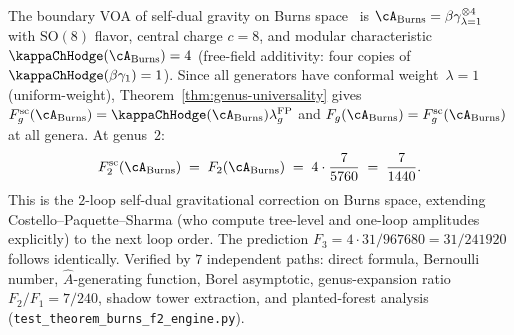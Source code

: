 \begin{remark}%
\label{rem:burns-f2-verification}%
%
%
%
The boundary VOA of self-dual gravity on Burns
space~\cite{CPS2208,CPS2306} is
$\cA_{\mathrm{Burns}} = \beta\gamma^{\otimes 4}_{\lambda=1}$
with $\mathrm{SO}(8)$ flavor, central charge $c = 8$,
and modular characteristic
$\kappaChHodge(\cA_{\mathrm{Burns}}) = 4$ (free-field additivity:
four copies of $\kappaChHodge(\beta\gamma_1) = 1$).
Since all generators have conformal weight~$\lambda = 1$
(uniform-weight), Theorem~\ref{thm:genus-universality}
 gives
 $F_g^{\mathrm{sc}}(\cA_{\mathrm{Burns}})
 =\kappaChHodge(\cA_{\mathrm{Burns}})
 \lambda_g^{\mathrm{FP}}$ and
 $F_g(\cA_{\mathrm{Burns}})
 =F_g^{\mathrm{sc}}(\cA_{\mathrm{Burns}})$
 at all genera. At genus~$2$:
\[
F_2^{\mathrm{sc}}(\cA_{\mathrm{Burns}})
\;=\;
F_2(\cA_{\mathrm{Burns}})
\;=\;
4 \cdot \frac{7}{5760}
\;=\;
\frac{7}{1440}.
\]
This is the $2$-loop self-dual gravitational correction on
Burns space, extending Costello--Paquette--Sharma (who compute
tree-level and one-loop amplitudes explicitly) to the next loop
order. The prediction $F_3 = 4 \cdot 31/967680 = 31/241920$
follows identically.
Verified by $7$ independent paths: direct formula,
Bernoulli number, $\hat{A}$-generating function,
Borel asymptotic, genus-expansion ratio $F_2/F_1 = 7/240$,
shadow tower extraction, and planted-forest analysis
\textup{(}\texttt{test\_theorem\_burns\_f2\_engine.py}\textup{)}.
\end{remark}

